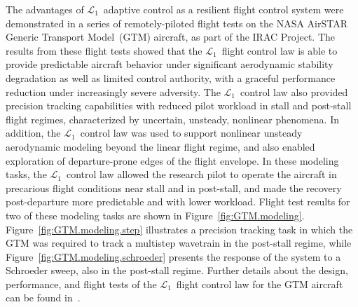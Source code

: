 \documentclass[letter,onecolumn,12pt]{aiaa-tc}
\newcommand{\Lone}{\mathcal{L}_1}
\begin{document}

The advantages of $\Lone$~adaptive control as a resilient flight control system were demonstrated in a series of remotely-piloted flight tests on the NASA AirSTAR Generic Transport Model~(GTM) aircraft, as part of the IRAC Project. The results from these flight tests showed that the $\Lone$~flight control law is able to provide predictable aircraft behavior under significant aerodynamic stability degradation as well as limited control authority, with a graceful performance reduction under increasingly severe adversity. The $\Lone$~control law also provided precision tracking capabilities with reduced pilot workload in stall and post-stall flight regimes, characterized by uncertain, unsteady, nonlinear phenomena. In addition, the $\Lone$~control law was used to support nonlinear unsteady aerodynamic modeling beyond the linear flight regime, and also enabled exploration of departure-prone edges of the flight envelope. In these modeling tasks, the $\Lone$~control law allowed the research pilot to operate the aircraft in precarious flight conditions near stall and in post-stall, and made the recovery post-departure more predictable and with lower workload. Flight test results for two of these modeling tasks are shown in Figure~\ref{fig:GTM.modeling}. Figure~\ref{fig:GTM.modeling.step} illustrates a precision tracking task in which the GTM was required to track a multistep wavetrain in the post-stall regime, while Figure~\ref{fig:GTM.modeling.schroeder} presents the response of the system to a Schroeder sweep, also in the post-stall regime. Further details about the design, performance, and flight tests of the $\Lone$~flight control law for the GTM aircraft can be found in~\cite{GNC09_AirSTAR,GNC10_AirSTAR,GNC11_AirSTAR,L1inflight}.
\end{document}
